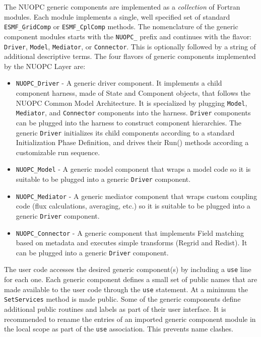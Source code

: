 
The NUOPC generic components are implemented as a {\em collection} of Fortran modules. Each module implements a single, well specified set of standard {\tt ESMF\_GridComp} or {\tt ESMF\_CplComp} methods. The nomenclature of the generic component modules starts with the {\tt NUOPC\_} prefix and continues with the flavor: {\tt Driver}, {\tt Model}, {\tt Mediator}, or {\tt Connector}. This is optionally followed by a string of additional descriptive terms. The four flavors of generic components implemented by the NUOPC Layer are:

\begin{itemize}

\item {\tt NUOPC\_Driver} - A generic driver component. It implements a child component harness, made of State and Component objects, that follows the NUOPC Common Model Architecture. It is specialized by plugging {\tt Model}, {\tt Mediator}, and {\tt Connector} components into the harness. {\tt Driver} components can be plugged into the harness to construct component hierarchies. The generic {\tt Driver} initializes its child components according to a standard Initialization Phase Definition, and drives their Run() methods according a customizable run sequence.

\item {\tt NUOPC\_Model} - A generic model component that wraps a model code so it is suitable to be plugged into a generic {\tt Driver} component.

\item {\tt NUOPC\_Mediator} - A generic mediator component that wraps custom coupling code (flux calculations, averaging, etc.) so it is suitable to be plugged into a generic {\tt Driver} component.

\item {\tt NUOPC\_Connector} - A generic component that implements Field matching based on metadata and executes simple transforms (Regrid and Redist). It can be plugged into a generic {\tt Driver} component.

\end{itemize}

The user code accesses the desired generic component(s) by including a {\tt use} line for each one. Each generic component defines a small set of public names that are made available to the user code through the {\tt use} statement. At a minimum the {\tt SetServices} method is made public. Some of the generic components define additional public routines and labels as part of their user interface. It is recommended to rename the entries of an imported generic component module in the local scope as part of the {\tt use} association. This prevents name clashes.

